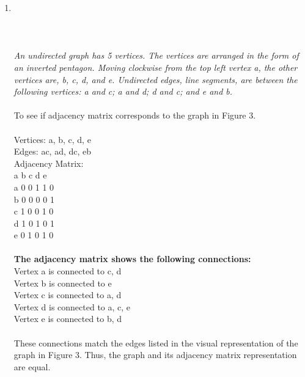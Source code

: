 \documentclass{amsart}
\theoremstyle{definition}
\theoremstyle{Exercise}
\theoremstyle{remark}
\theoremstyle{rule}
\numberwithin{equation}{section}
\begin{document}
\begin{enumerate}[label=(\alph*)]
\newpage
 \item
\hfil
  \\\\
\\
\\
   {\color{blue}{\bf Figure 3:} \emph{An undirected graph has 5 vertices. The vertices are arranged in the form of an inverted pentagon. Moving clockwise from the top left vertex a, the other vertices are, b, c, d, and e. Undirected edges, line segments, are between the following vertices: a and c; a and d; d and c; and e and b. 
  \\\\
}
}
 To see if adjacency matrix corresponds to the graph in Figure 3.\\\\
Vertices: a, b, c, d, e\\
Edges: ac, ad, dc, eb\\
Adjacency Matrix:\\
a	b	c	d	e\\
a	0	0	1	1	0\\
b	0	0	0	0	1\\
c	1	0	0	1	0\\
d	1	0	1	0	1\\
e	0	1	0	1	0\\\\
\textbf{The adjacency matrix shows the following connections:}\\
Vertex a is connected to c, d\\
Vertex b is connected to e\\
Vertex c is connected to a, d\\
Vertex d is connected to a, c, e\\
Vertex e is connected to b, d\\\\
These connections match the edges listed in the visual representation of the graph in Figure 3. Thus, the graph and its adjacency matrix representation are equal.

 \newpage


\end{enumerate}
\end{document}
